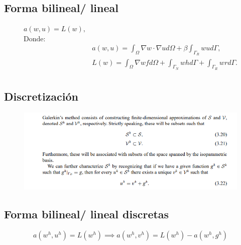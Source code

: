 \documentclass[12pt]{article}
\begin{document}
\subsection{Forma bilineal/ lineal}
\begin{align*}
  a(w,u)=L(w), &\\
  \text{Donde: }& \\
  &a(w,u) = \int_{\Omega} \nabla w \cdot \nabla u  d\Omega + \beta \int_{	\Gamma_R} wu d\Gamma,\\
  &L(w) = \int_{\Omega} \nabla w f  d\Omega + \int_{	\Gamma_N} wh d\Gamma+ \int_{	\Gamma_R} wr d\Gamma.\\
\end{align*}
\subsection{Discretización}
\begin{figure}[h]
\includegraphics[width=15cm]{Discretizacion.png}
\centering
\end{figure}
\subsection{Forma bilineal/ lineal discretas}
\begin{equation*}
  a(w^h,u^h)=L(w^h) \implies a(w^h,v^h)=L(w^h)-a(w^h,g^h)  
\end{equation*}
\end{document}
